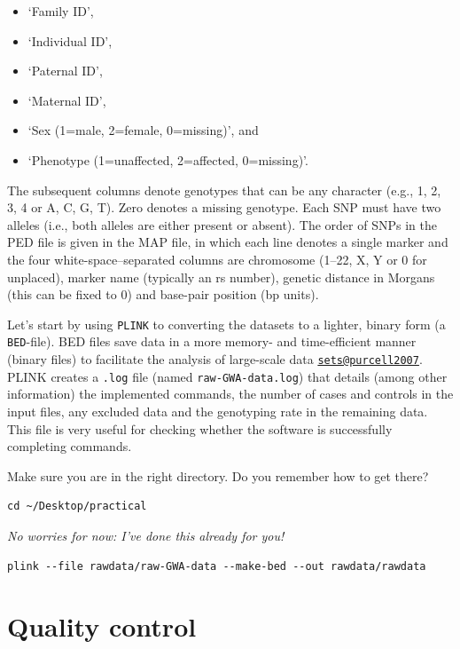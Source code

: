 \documentclass[
]{book}
\providecommand{\tightlist}{%
  \setlength{\itemsep}{0pt}\setlength{\parskip}{0pt}}
\begin{document}
\begin{itemize}
\tightlist
\item
  `Family ID',
\item
  `Individual ID',
\item
  `Paternal ID',
\item
  `Maternal ID',
\item
  `Sex (1=male, 2=female, 0=missing)', and
\item
  `Phenotype (1=unaffected, 2=affected, 0=missing)'.
\end{itemize}

The subsequent columns denote genotypes that can be any character (e.g., 1, 2, 3, 4 or A, C, G, T). Zero denotes a missing genotype. Each SNP must have two alleles (i.e., both alleles are either present or absent).
The order of SNPs in the PED file is given in the MAP file, in which each line denotes a single marker and the four white-space--separated columns are chromosome (1--22, X, Y or 0 for unplaced), marker name (typically an rs number), genetic distance in Morgans (this can be fixed to 0) and base-pair position (bp units).

Let's start by using \texttt{PLINK} to converting the datasets to a lighter, binary form (a \texttt{BED}-file). BED files save data in a more memory- and time-efficient manner (binary files) to facilitate the analysis of large-scale data \href{mailto:sets@purcell2007}{\nolinkurl{sets@purcell2007}}. PLINK creates a \texttt{.log} file (named \texttt{raw-GWA-data.log}) that details (among other information) the implemented commands, the number of cases and controls in the input files, any excluded data and the genotyping rate in the remaining data. This file is very useful for checking whether the software is successfully completing commands.

Make sure you are in the right directory. Do you remember how to get there?

\begin{verbatim}
cd ~/Desktop/practical
\end{verbatim}

\emph{No worries for now: I've done this already for you!}

\begin{verbatim}
plink --file rawdata/raw-GWA-data --make-bed --out rawdata/rawdata
\end{verbatim}

\hypertarget{quality-control}{%
\section{Quality control}\label{quality-control}}
\end{document}
